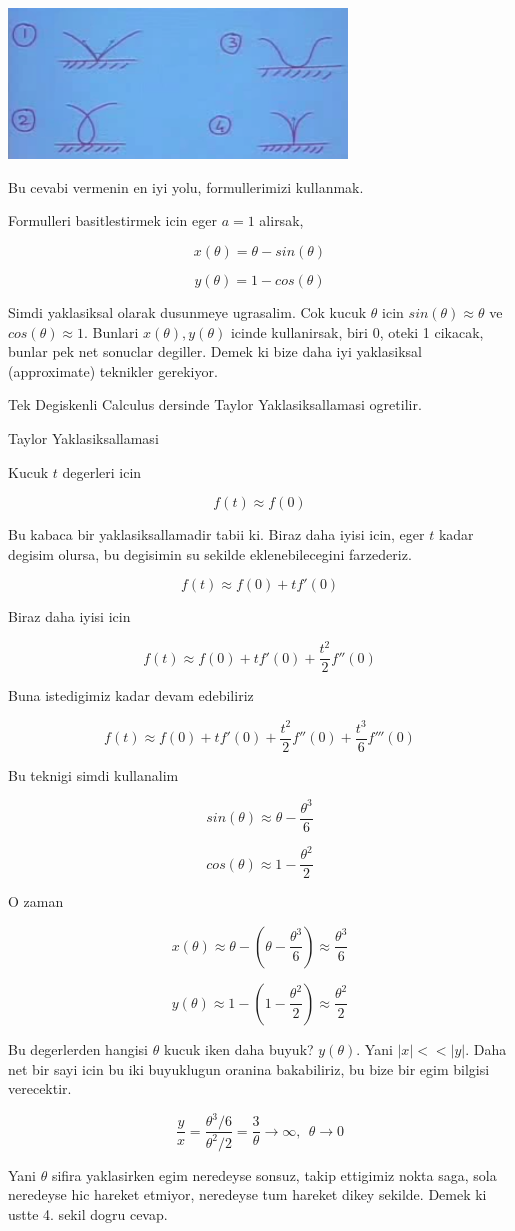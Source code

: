 \documentclass[12pt,fleqn]{article}
\begin{document}
\includegraphics[height=4cm]{5_8.png}

Bu cevabi vermenin en iyi yolu, formullerimizi kullanmak. 

Formulleri basitlestirmek icin eger $a=1$ alirsak, 

\[ x(\theta) = \theta - sin(\theta) \]

\[ y(\theta) = 1 - cos(\theta) \]

Simdi yaklasiksal olarak dusunmeye ugrasalim. Cok kucuk $\theta$ icin
$sin(\theta) \approx \theta$ ve $cos(\theta) \approx 1$. Bunlari
$x(\theta), y(\theta)$ icinde kullanirsak, biri 0, oteki 1 cikacak, bunlar
pek net sonuclar degiller. Demek ki bize daha iyi yaklasiksal (approximate)
teknikler gerekiyor. 

Tek Degiskenli Calculus dersinde Taylor Yaklasiksallamasi ogretilir. 

Taylor Yaklasiksallamasi

Kucuk $t$ degerleri icin 

\[ f(t) \approx f(0) \]

Bu kabaca bir yaklasiksallamadir tabii ki. Biraz daha iyisi icin, eger $t$
kadar degisim olursa, bu degisimin su sekilde eklenebilecegini farzederiz.

\[ f(t) \approx f(0) + tf'(0)\]

Biraz daha iyisi icin

\[ f(t) \approx f(0) + tf'(0) + \frac{t^2}{2}f''(0)\]

Buna istedigimiz kadar devam edebiliriz

\[ f(t) \approx f(0) + tf'(0) + \frac{t^2}{2}f''(0) + \frac{t^3}{6}f'''(0)\]

Bu teknigi simdi kullanalim

\[ sin(\theta) \approx \theta - \frac{\theta^3}{6} \]

\[ cos(\theta) \approx 1 - \frac{\theta^2}{2} \]

O zaman

\[ x(\theta) \approx \theta - (\theta  - \frac{\theta^3}{6}) 
\approx \frac{\theta^3}{6} 
\]

\[ y(\theta) \approx 1 - (1  - \frac{\theta^2}{2}) 
\approx \frac{\theta^2}{2} 
\]

Bu degerlerden hangisi $\theta$ kucuk iken daha buyuk? $y(\theta)$. Yani
$|x| << |y|$. Daha net bir sayi icin bu iki buyuklugun oranina bakabiliriz,
bu bize bir egim bilgisi verecektir. 

\[ \frac{y}{x} = \frac{\theta^3/6}{\theta^2/2 } = 
\frac{3}{\theta} \to \infty, \ \ \theta \to 0
\]

Yani $\theta$ sifira yaklasirken egim neredeyse sonsuz, takip ettigimiz
nokta saga, sola neredeyse hic hareket etmiyor, neredeyse tum hareket dikey
sekilde. Demek ki ustte 4. sekil dogru cevap. 
\end{document}
